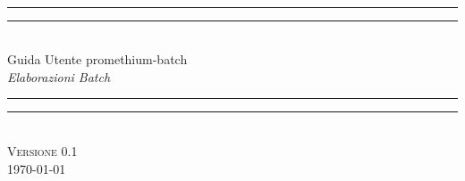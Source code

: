 \begin{titlepage}
\newlength{\drop}%
\textheight
\centering
\settowidth{\unitlength}{\Huge Guida Utente promethium-batch}
\vspace*{\baselineskip}
\\[\baselineskip]
\rule{\unitlength}{1.6pt}\vspace*{-\baselineskip}\vspace*{2pt}
\rule{\unitlength}{0.4pt}\\[\baselineskip]
{\Huge Guida Utente promethium-batch}\\[\baselineskip]
{\large\itshape Elaborazioni Batch}\\[0.2\baselineskip]
\rule{\unitlength}{0.4pt}\vspace*{-\baselineskip}\vspace{3.2pt}
\rule{\unitlength}{1.6pt}\\[\baselineskip]
\vfill
{\large\scshape Versione 0.1}\\[\baselineskip]
{\small\scshape \today}\par
\vspace*{\drop}
\end{titlepage}
